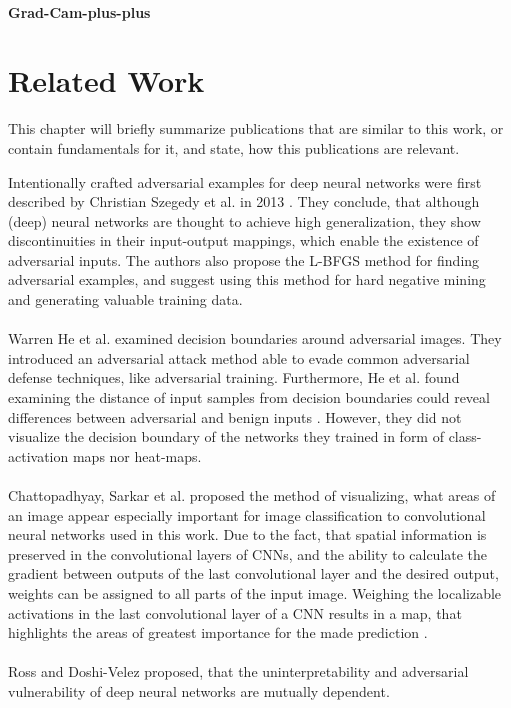 \documentclass[draft,final]{vutinfth} %
\begin{document}
\subsubsection{Grad-Cam-plus-plus}

\chapter{Related Work}

This chapter will briefly summarize publications that are similar to this work, or contain fundamentals for it, and state, how this publications are relevant.

Intentionally crafted adversarial examples for deep neural networks were first described by Christian Szegedy et al. in 2013 \cite{Szegedy2013}.
They conclude, that although (deep) neural networks are thought to achieve high generalization, they show discontinuities in their input-output mappings, which enable the existence of adversarial inputs.
The authors also propose the L-BFGS method for finding adversarial examples, and suggest using this method for hard negative mining and generating valuable training data.\\
\\
Warren He et al. examined decision boundaries around adversarial images.
They introduced an adversarial attack method able to evade common adversarial defense techniques, like adversarial training.
Furthermore, He et al. found examining the distance of input samples from decision boundaries could reveal differences between adversarial and benign inputs \cite{He2018}.
However, they did not visualize the decision boundary of the networks they trained in form of class-activation maps nor heat-maps.\\
\\
Chattopadhyay, Sarkar et al. proposed the method of visualizing, what areas of an image appear especially important for image classification to convolutional neural networks used in this work. 
Due to the fact, that spatial information is preserved in the convolutional layers of CNNs, and the ability to calculate the gradient between outputs of the last convolutional layer and the desired output, weights can be assigned to all parts of the input image.
Weighing the localizable activations in the last convolutional layer of a CNN results in a map, that highlights the areas of greatest importance for the made prediction \cite{Chattopadhyay2017}.\\
\\
Ross and Doshi-Velez proposed, that the uninterpretability and adversarial vulnerability of deep neural networks are mutually dependent.
\end{document}
